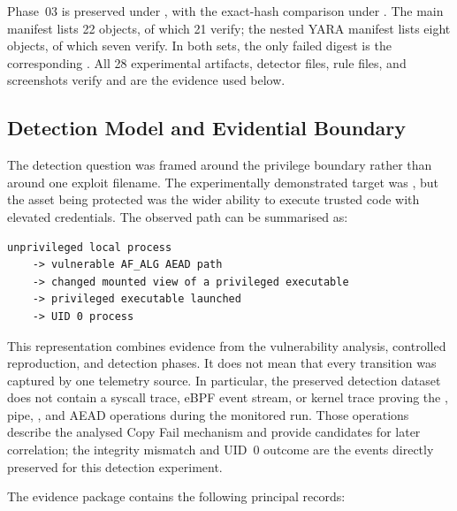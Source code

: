 \begin{evidencebox}
Phase~03 is preserved under , with the exact-hash
comparison under . The main
manifest lists 22 objects, of which 21 verify; the nested YARA manifest lists
eight objects, of which seven verify. In both sets, the only failed digest is
the corresponding . All 28 experimental artifacts, detector
files, rule files, and screenshots verify and are the evidence used below.
\end{evidencebox}

\subsection{Detection Model and Evidential Boundary}

The detection question was framed around the privilege boundary rather than
around one exploit filename. The experimentally demonstrated target was
, but the asset being protected was the wider ability to
execute trusted code with elevated credentials. The observed path can be
summarised as:

\begin{lstlisting}
unprivileged local process
    -> vulnerable AF_ALG AEAD path
    -> changed mounted view of a privileged executable
    -> privileged executable launched
    -> UID 0 process
\end{lstlisting}

This representation combines evidence from the vulnerability analysis,
controlled reproduction, and detection phases. It does not mean that every
transition was captured by one telemetry source. In particular, the preserved
detection dataset does not contain a syscall trace, eBPF event stream, or
kernel trace proving the , pipe, , and AEAD
operations during the monitored run. Those operations describe the analysed
Copy Fail mechanism and provide candidates for later correlation; the
integrity mismatch and UID~0 outcome are the events directly preserved for
this detection experiment.

The evidence package contains the following principal records:

